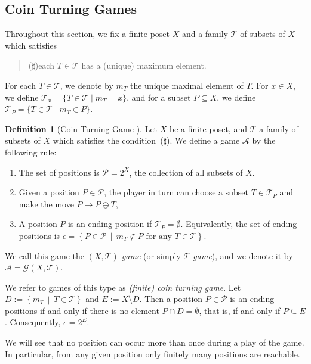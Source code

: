 \documentclass[a4paper,11pt]{amsart}
\theoremstyle{definition}
\newtheorem{dfn}{Definition}[section]
\numberwithin{equation}{section}
\def\P{\mathcal{P}}
\def\Game{\mathscr{A}}
\def\Pgame{\mathscr{G}}
\def\T{\mathscr{T}}
\begin{document}
\subsection{Coin Turning Games}\label{ssc:XTgame}
%
Throughout this section, we fix a finite poset $X$ 
and a family $\T$ of subsets of $X$
which satisfies 
\begin{quote}
		($\sharp$)\qquad each $T \in \T$ has a (unique) maximum element.
\end{quote}
%
For each $T\in\T$,
we denote by $m_{T}$ the unique maximal element of $T$.
For $x\in X$,
we define $\T_{x}=\{T\in\T\mid m_{T}=x\}$,
and for a subset $P\subseteq X$,
we define $\T_{P}=\{T\in\T\mid m_{T}\in P\}$.
%
\begin{dfn}[Coin Turning Game \cite{Lenstra,Sato}]\label{def:PosetGame}
	Let $X$ be a finite poset,
	and $\T$ a family of subsets of $X$
	which satisfies the condition~($\sharp$).
	We define a game 
	$\Game$ 
	by the following rule:
\begin{enumerate}[label=(\alph*)] %
\item\label{it:PG01}
	The set of positions is $\P = {2}^{X}$,
	the collection of all subsets of $X$.
%
\item\label{it:PG02}
	Given a position $P\in\P$, 
	the player in turn can choose a subset $T \in \T_{P}$ 
	and make the move $P\to P \ominus T$,
\item\label{it:PG03}
	A position $P$ is an ending position if $\T_{P}=\emptyset$.
	Equivalently, the set of ending positions is
			$
				\epsilon
				=
				\left\{
					P \in \P
				\, \middle| \,
					{m}_{T} \notin P
					\textrm{ for any }
					T \in \T
				\right\}
			$.
\end{enumerate} %
	We call this game the \textsl{$(X,\T)$-game} (or simply \textsl{$\T$-game}),
	and we denote it by $\Game=\Pgame(X, \T)$.
\end{dfn}
%
We refer to games of this type as \textsl{(finite) coin turning game}.
Let $D:=\left\{m_{T}\,\middle|\, T\in \T\right\}$ and $E:=X\setminus D$.
%
Then a position $P\in \P$ is an ending positions if and only if there is no element $P \cap D=\emptyset$,
that is, if and only if $P\subseteq E$.
Consequently, $\epsilon=2^E$.
%
\par\smallskip
%
We will see that no position can occur more than once during a play of the game.
In particular, from any given position only finitely many positions are reachable.
\end{document}
